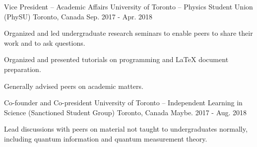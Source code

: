 

\begin{cventries}

  \cventry
    {Vice President -- Academic Affairs} %
    {University of Toronto -- Physics Student Union (PhySU)} %
    {Toronto, Canada} %
    {Sep. 2017 - Apr. 2018} %
    {
      \begin{cvitems}
      \item{Organized and led undergraduate research seminars to enable peers to share
          their work and to ask questions.}
      \item{Organized and presented tutorials on programming and \LaTeX{}
          document preparation.}
      \item{Generally advised peers on academic matters.}
      \end{cvitems}
    }

  \cventry
    {Co-founder and Co-president} %
    {University of Toronto -- Independent Learning in Science (Sanctioned
      Student Group)} %
    {Toronto, Canada} %
    {Maybe. 2017 - Aug. 2018} %
    {
      \begin{cvitems} %
        \item{Lead discussions with peers on material not taught to
            undergraduates normally, including quantum information and quantum
            measurement theory.}
      \end{cvitems}
    }

\end{cventries}

